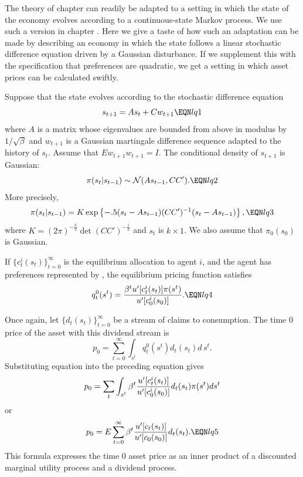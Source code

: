  The theory  of chapter 
can readily be adapted to a setting in which
the state of the economy evolves according to a continuous-state
 Markov process.   We use such a version in chapter .
Here we give a taste of how  such an adaptation can be made
by describing an economy in which the state follows a linear stochastic
difference equation driven by a Gaussian  disturbance.  If we supplement
this with the specification that preferences are quadratic,
we get a setting in which asset prices can be calculated swiftly.




  Suppose that the state evolves   according to the stochastic
difference equation
$$ s_{t+1} = A s_t + C w_{t+1}   \EQN lq1 $$
where $A$ is a matrix whose eigenvalues are bounded from
above in modulus by $1 /  \sqrt {\beta}$ and
$w_{t+1}$ is a Gaussian martingale difference sequence adapted to
the history of $s_t$.  Assume that $E w_{t+1} w_{t+1} = I$.
The conditional density of $s_{t+1}$  is Gaussian:
$$ \pi(s_t \vert s_{t-1}) \sim {\cal N}(As_{t-1}, CC'). \EQN lq2$$
More precisely,
$$ \pi(s_t \vert s_{t-1}) = K \exp \left\{ -.5 (s_t - As_{t-1} )
         (C C')^{-1} (s_t - A s_{t-1} ) \right\} , \EQN lq3 $$
where $K = (2 \pi)^{-{\frac k 2}} \det (CC')^{-{\frac 1 2}}$ and $s_t$
is  $k \times 1$.   We also assume that $\pi_0(s_0)$ is
Gaussian.




  If $\{c_t^i(s_t)\}_{t=0}^\infty$ is the equilibrium allocation to
agent $i$, and the agent has preferences  represented by
, the equilibrium
pricing function satisfies
$$  q_t^0(s^t)= {\beta^t u'[c_t^i(s_t)] \pi(s^t) \over u'[c_0^i(s_0)]}
     .\EQN lq4 $$






Once again, let $\{d_t(s_t)\}_{t=0}^\infty$
 be a stream of claims to consumption.
The time $0$ price of the asset with this dividend stream is
$$ p_0  = \sum_{t=0}^\infty \int_{s^t} q_t^0(s^t) d_t(s_t) d \, s^t .$$
Substituting equation  into the preceding equation gives
$$ p_0 =  \sum_t \int_{s^t} \beta^t { u'[c_t^i(s_t)]
  \over u'[c_0^i(s_0)]} d_t(s_t) \pi(s^t)
  d s^t $$
or
$$ p_0 = E \sum_{t=0}^\infty \beta^t { u'[c_t(s_t)]
     \over u'[c_0(s_0)]} d_t(s_t) .\EQN lq5$$
This formula expresses the time $0$ asset price as
an inner product of a discounted marginal utility process and a dividend
 process.




